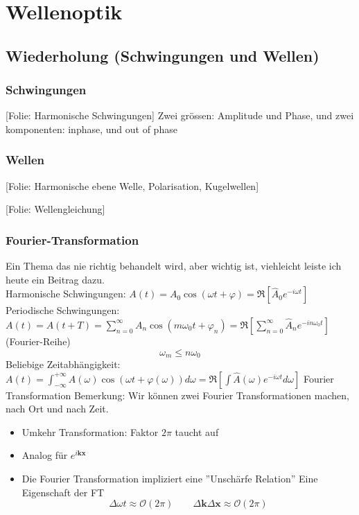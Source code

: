 \documentclass[titlepage,11pt,a4paper,ngerman]{report}
\newcommand{\folie}[1]{\color{gray}[Folie: #1]\color{black}}
\newcommand{\summ}[2]{\sum_{#1}^{#2}}
\newcommand{\intt}[2]{\int_{#1}^{#2}}
\renewcommand{\vec}[1]{\boldsymbol{#1}}
\newcommand{\lcom}[1]{\color{MidnightBlue}#1\color{black}}
\begin{document}
\chapter{Wellenoptik}
\section{Wiederholung (Schwingungen und Wellen)}
\subsection{Schwingungen}
\folie{Harmonische Schwingungen}
\lcom{Zwei grössen: Amplitude und Phase, und zwei komponenten: inphase, und out of phase}
\subsection{Wellen}
\folie{Harmonische ebene Welle, Polarisation, Kugelwellen}


\folie{Wellengleichung}

\subsection{Fourier-Transformation}
\lcom{Ein Thema das nie richtig behandelt wird, aber wichtig ist, viehleicht leiste ich heute ein Beitrag dazu.}\\
Harmonische Schwingungen: $A(t) = A_0 \cos (\omega t + \varphi) = \Re [\hat A_0 e^{-i\omega t}]$\\
Periodische Schwingungen: $A(t) = A(t + T) = \summ{n = 0}{\infty} A_n \cos(m \omega_0 t + \varphi_n) = \Re [\summ{n = 0}{\infty} \hat A_n e^{-i n \omega_0 t}]$ (Fourier-Reihe)
$$\omega_m \leq n \omega_0$$
Beliebige Zeitabhängigkeit: $A(t) = \intt{-\infty}{+\infty} A(\omega) \cos (\omega t + \varphi(\omega)) d \omega = \Re [\int \hat A (\omega) e^{-i\omega t} d \omega]$ Fourier Transformation
Bemerkung:
\lcom{Wir können zwei Fourier Transformationen machen, nach Ort und nach Zeit.}
\begin{itemize}
	\item Umkehr Transformation: Faktor $2 \pi$ taucht auf
	\item Analog für $e^{i \vec{k} \vec{x}}$
	\item Die Fourier Transformation impliziert eine ''Unschärfe Relation'' \lcom{Eine Eigenschaft der FT}
		$$\Delta \omega t \approx \mathcal O(2 \pi) \qquad \Delta \vec{k} \Delta \vec{x} \approx \mathcal O(2\pi)$$
\end{itemize}
\end{document}
